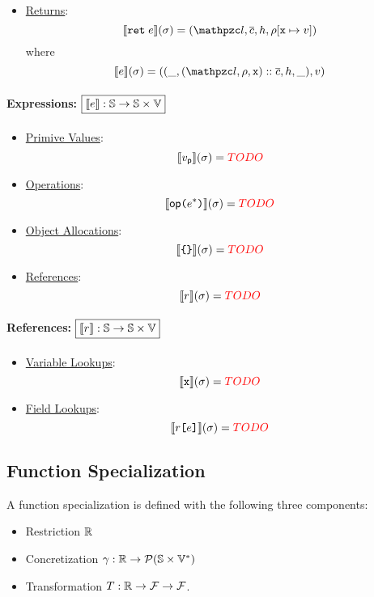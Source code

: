 \begin{itemize}
  \item \underline{Returns}:
    \[
      \sem{\kwret \; \expr}(\st) = (\lab, \ctxts, \heap, \env[\varx \mapsto
      \val])
    \]
    where
    \[
      \sem{\expr}(\st) = ((\_, (\lab, \env, \varx) :: \ctxts, \heap, \_), \val)
    \]
\end{itemize}

\paragraph{Expressions: $\framebox{$\sem{\expr}: \stset \rightarrow \stset
\times \valset$}$}
\begin{itemize}
  \item \underline{Primive Values}:
    \[
      \llbracket{v_{\textsf{p}}}\rrbracket(\sigma) = {\color{red}{TODO}}
    \]
  \item \underline{Operations}:
    \[
      \llbracket{\textsf{op}\texttt{(}e^* \texttt{)}}\rrbracket(\sigma) = {\color{red}{TODO}}
    \]
  \item \underline{Object Allocations}:
    \[
      \llbracket{\texttt{\{}\texttt{\}}}\rrbracket(\sigma) = {\color{red}{TODO}}
    \]
  \item \underline{References}:
    \[
      \llbracket{r}\rrbracket(\sigma) = {\color{red}{TODO}}
    \]
\end{itemize}

\paragraph{References: $\framebox{$\sem{\refer}: \stset \rightarrow \stset
\times \valset$}$}
\begin{itemize}
  \item \underline{Variable Lookups}:
    \[
      \llbracket{\texttt{x}}\rrbracket(\sigma) = {\color{red}{TODO}}
    \]
  \item \underline{Field Lookups}:
    \[
      \llbracket{r\texttt{[}e\texttt{]}}\rrbracket(\sigma) = {\color{red}{TODO}}
    \]
\end{itemize}





\subsection{Function Specialization}

\todo

A function specialization is defined with the following three components:
\begin{itemize}
  \item Restriction $\mathbb{R}$
  \item Concretization $\gamma: \mathbb{R} \rightarrow \mathcal{P}(\mathbb{S}
    \times \mathbb{V}^*)$
  \item Transformation $T: \mathbb{R} \rightarrow \mathcal{F}
    \rightarrow \mathcal{F}$.
\end{itemize}

